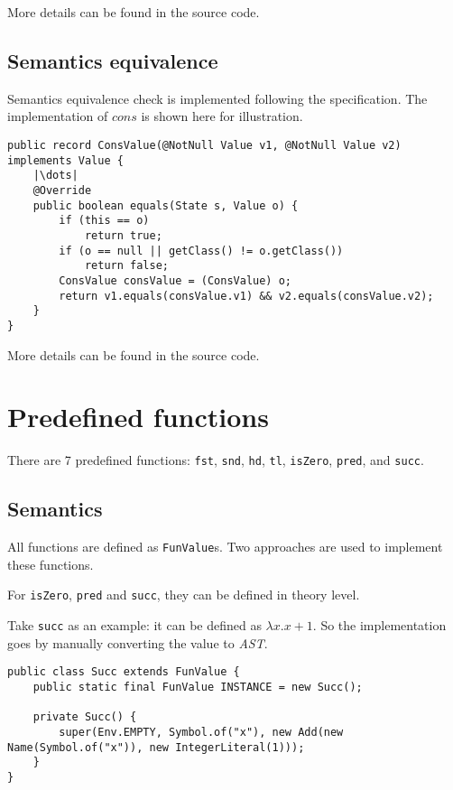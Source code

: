 \documentclass[a4paper]{article}
\begin{document}
More details can be found in the source code.

\subsection{Semantics equivalence}

Semantics equivalence check is implemented following the specification. The implementation of $cons$ is shown here for illustration.

\begin{verbatim}
public record ConsValue(@NotNull Value v1, @NotNull Value v2) implements Value {
    |\dots|
    @Override
    public boolean equals(State s, Value o) {
        if (this == o)
            return true;
        if (o == null || getClass() != o.getClass())
            return false;
        ConsValue consValue = (ConsValue) o;
        return v1.equals(consValue.v1) && v2.equals(consValue.v2);
    }
}
\end{verbatim}

More details can be found in the source code.

\section{Predefined functions}

There are 7 predefined functions: \texttt{fst}, \texttt{snd}, \texttt{hd}, \texttt{tl}, \texttt{isZero}, \texttt{pred}, and \texttt{succ}.

\subsection{Semantics}

All functions are defined as \texttt{FunValue}s. Two approaches are used to implement these functions.

For \texttt{isZero}, \texttt{pred} and \texttt{succ}, they can be defined in theory level.

Take \texttt{succ} as an example: it can be defined as $\lambda x.x+1$. So the implementation goes by
manually converting the value to \textit{AST}.

\begin{verbatim}
public class Succ extends FunValue {
    public static final FunValue INSTANCE = new Succ();

    private Succ() {
        super(Env.EMPTY, Symbol.of("x"), new Add(new Name(Symbol.of("x")), new IntegerLiteral(1)));
    }
}
\end{verbatim}
\end{document}
